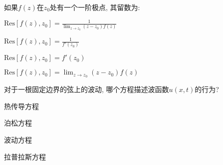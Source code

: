 \documentclass{njustexam}
\begin{document}
\begin{problem}
  如果$f(z)$在$z_0$处有一个一阶极点, 其留数为: 
\begin{abcd}
  \item $\text{Res}[f(z),  z_0] = \frac{1}{\lim_{z \to z_0} (z - z_0)f(z)}$
  \item $\text{Res}[f(z),  z_0] = \frac{1}{f'(z_0)}$
  \item $\text{Res}[f(z),  z_0] = f'(z_0)$
   \item $\text{Res}[f(z),  z_0] = \lim_{z \to z_0} (z - z_0)f(z)$
\end{abcd}
\end{problem}










\begin{problem}
  对于一根固定边界的弦上的波动, 哪个方程描述波函数$u(x,  t)$的行为?
  \begin{abcd}
    \item 热传导方程 
    \item 泊松方程
    \item 波动方程
    \item 拉普拉斯方程
    \end{abcd}
\end{problem}



\end{document}

